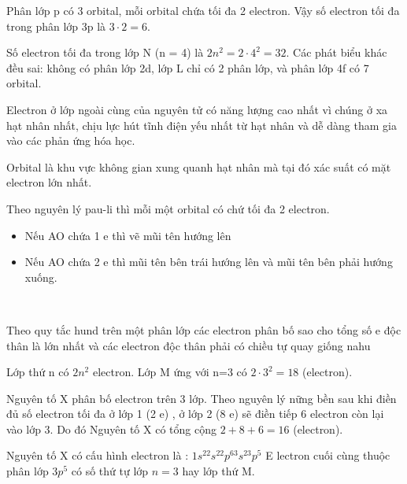 \begin{loigiaiex}{11}
 Phân lớp p có 3 orbital, mỗi orbital chứa tối đa 2 electron. Vậy số electron tối đa trong phân lớp 3p là $3 \cdot 2 = 6$. \phantom {a}\hfill { \faKey ~}
\end{loigiaiex}
\begin{loigiaiex}{12}
 Số electron tối đa trong lớp N (n = 4) là $2n^2 = 2 \cdot 4^2 = 32$. Các phát biểu khác đều sai: không có phân lớp 2d, lớp L chỉ có 2 phân lớp, và phân lớp 4f có 7 orbital. \phantom {a}\hfill { \faKey ~}
\end{loigiaiex}
\begin{loigiaiex}{13}
 Electron ở lớp ngoài cùng của nguyên tử có năng lượng cao nhất vì chúng ở xa hạt nhân nhất, chịu lực hút tĩnh điện yếu nhất từ hạt nhân và dễ dàng tham gia vào các phản ứng hóa học. \phantom {a}\hfill { \faKey ~}
\end{loigiaiex}
\begin{loigiaiex}{14}
  Orbital là khu vực không gian xung quanh hạt nhân mà tại đó xác suất có mặt electron lớn nhất.  \phantom {a}\hfill { \faKey ~}
\end{loigiaiex}
\begin{loigiaiex}{15}
  Theo nguyên lý pau-li thì mỗi một orbital có chứ tối đa 2 electron. \begin {itemize} \item Nếu AO chứa 1 e thì vẽ mũi tên hướng lên \item Nếu AO chứa 2 e thì mũi tên bên trái hướng lên và mũi tên bên phải hướng xuống. \end {itemize}  \phantom {a}\hfill { \faKey ~}
\end{loigiaiex}
\begin{loigiaiex}{16}
  Theo quy tắc hund trên một phân lớp các electron phân bố sao cho tổng số e độc thân là lớn nhất và các electron độc thân phải có chiều tự quay giống nahu  \phantom {a}\hfill { \faKey ~}
\end{loigiaiex}
\begin{loigiaiex}{17}
  Lớp thứ n có $2n^2$ electron. Lớp M ứng với n=3 có $2\cdot 3^2=18$ (electron).  \phantom {a}\hfill { \faKey ~}
\end{loigiaiex}
\begin{loigiaiex}{18}
  Nguyên tố X phân bố electron trên 3 lớp. Theo nguyên lý nững bền sau khi điền đủ số electron tối đa ở lớp 1 (2 e) , ở lớp 2 (8 e) sẽ điền tiếp 6 electron còn lại vào lớp 3. Do đó Nguyên tố X có tổng cộng $2+8+6=16$ (electron).  \phantom {a}\hfill { \faKey ~}
\end{loigiaiex}
\begin{loigiaiex}{19}
  Nguyên tố X có cấu hình electron là : $1s^22s^22p^63s^23p^5$ E lectron cuối cùng thuộc phân lớp $3p^5$ có số thứ tự lớp $n=3$ hay lớp thứ M.  \phantom {a}\hfill { \faKey ~}
\end{loigiaiex}

